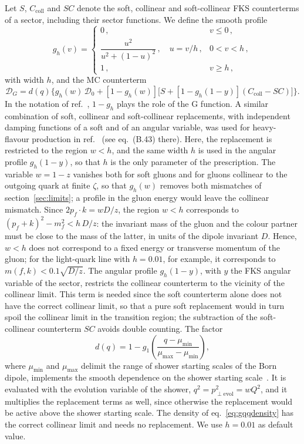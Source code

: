 \documentclass[a4paper,11pt]{article}
\newcommand{\Dens}{\mathcal{D}}
\begin{document}
Let $S$, $C_{\mathrm{coll}}$ and $SC$ denote the soft, collinear and
soft-collinear FKS counterterms of a sector, including their sector
functions. We define the smooth profile
\begin{equation}
  g_h(v)=\begin{cases}
    0\,, & v\le0\,,\\[2pt]
    \dfrac{u^2}{u^2+(1-u)^2}\,,\quad u=v/h\,, & 0<v<h\,,\\[8pt]
    1\,, & v\ge h\,,
  \end{cases}
  \label{eq:profile}
\end{equation}
with width $h$, and the MC counterterm
\begin{equation}
  \Dens_G=d(q)\Big\{g_h(w)\,\Dens_0+\left[1-g_h(w)\right]
  \Big[S+\left[1-g_h(1-y)\right]\left(C_{\mathrm{coll}}-SC\right)\Big]\Big\}.
  \label{eq:DG}
\end{equation}
In the notation of ref.~\cite{Alwall:2014hca}, $1-g_h$ plays the role
of the G function. A similar combination of soft, collinear and
soft-collinear replacements, with independent damping functions of a
soft and of an angular variable, was used for heavy-flavour production
in ref.~\cite{Frixione:2003ei} (see eq.~(B.43) there). Here, the
replacement is restricted to the region $w<h$, and the same width $h$
is used in the angular profile $g_h(1-y)$, so that $h$ is the only
parameter of the prescription. The variable $w=1-z$ vanishes both for
soft gluons and for gluons collinear to the outgoing quark at finite
$\zeta$, so that $g_h(w)$ removes both mismatches of
section~\ref{sec:limits}; a profile in the gluon energy would leave the
collinear mismatch. Since $2p_f\cdot k=wD/z$, the region $w<h$
corresponds to $(p_f+k)^2-m_f^2<h\,D/z$: the invariant mass of the
gluon and the colour partner must be close to the mass of the latter,
in units of the dipole invariant $D$. Hence, $w<h$ does not correspond
to a fixed energy or transverse momentum of the gluon; for the
light-quark line with $h=0.01$, for example, it corresponds to
$m(f,k)<0.1\sqrt{D/z}$. The angular profile $g_h(1-y)$, with $y$ the
FKS angular variable of the sector, restricts the collinear
counterterm to the vicinity of the collinear limit. This term is
needed since the soft counterterm alone
does not have the correct collinear limit, so that a pure soft
replacement would in turn spoil the collinear limit in the transition
region; the subtraction of the soft-collinear counterterm $SC$ avoids
double counting. The factor
\begin{equation}
  d(q)=1-g_1\!\left(\frac{q-\mu_{\min}}{\mu_{\max}-\mu_{\min}}\right),
  \label{eq:damping}
\end{equation}
where $\mu_{\min}$ and $\mu_{\max}$ delimit the range of shower
starting scales of the Born dipole, implements the smooth dependence on
the shower starting scale~\cite{Alwall:2014hca}. It is evaluated with
the evolution variable of the shower, $q^2=p_{\perp\mathrm{evol}}^2=wQ^2$,
and it multiplies the replacement terms as well, since otherwise the
replacement would be active above the shower starting scale. The
density of eq.~\eqref{eq:gqqdensity} has the correct collinear limit
and needs no replacement. We use $h=0.01$ as default value.
\end{document}
